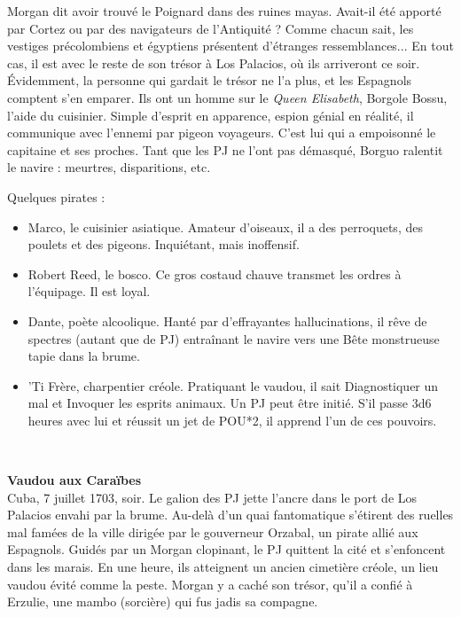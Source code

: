 \documentclass[11pt,twoside,a4paper]{book}
\begin{document}
Morgan dit avoir trouv{\'e} le Poignard dans des ruines mayas. Avait-il {\'e}t{\'e} apport{\'e} par Cortez ou par des navigateurs de l'Antiquit{\'e} ? Comme chacun sait, les vestiges pr{\'e}colombiens et {\'e}gyptiens pr{\'e}sentent d'{\'e}tranges ressemblances... En tout cas, il est avec le reste de son tr{\'e}sor {\`a} Los Palacios, o{\`u} ils arriveront ce soir. {\'E}videmment, la personne qui gardait le tr{\'e}sor ne l'a plus, et les Espagnols comptent s'en emparer. Ils ont un homme sur le \emph{Queen Elisabeth}, Borgole Bossu, l'aide du cuisinier. Simple d'esprit en apparence, espion g{\'e}nial en r{\'e}alit{\'e}, il communique avec l'ennemi par pigeon voyageurs. C'est lui qui a empoisonn{\'e} le capitaine et ses proches. Tant que les PJ ne l'ont pas d{\'e}masqu{\'e}, Borguo ralentit le navire : meurtres, disparitions, etc.~\\

\clearpage

Quelques pirates :
\setlength\parindent{20pt}
\begin{itemize}
	\item Marco, le cuisinier asiatique. Amateur d'oiseaux, il a des perroquets, des poulets et des pigeons. Inqui{\'e}tant, mais inoffensif.
	\item Robert Reed, le bosco. Ce gros costaud chauve transmet les ordres {\`a} l'{\'e}quipage. Il est loyal.
	\item Dante, po{\`e}te alcoolique. Hant{\'e} par d'effrayantes hallucinations, il r{\^e}ve de spectres (autant que de PJ) entra{\^i}nant le navire vers une B{\^e}te monstrueuse tapie dans la brume.
	\item 'Ti Fr{\`e}re, charpentier cr{\'e}ole. Pratiquant le vaudou, il sait Diagnostiquer un mal et Invoquer les esprits animaux. Un PJ peut {\^e}tre initi{\'e}. S'il passe 3d6 heures avec lui et r{\'e}ussit un jet de POU*2, il apprend l'un de ces pouvoirs.
\end{itemize}~\\
\setlength\parindent{0pt}

\textbf{\large Vaudou aux Cara{\"i}bes}~\\

Cuba, 7 juillet 1703, soir. Le galion des PJ jette l'ancre dans le port de Los Palacios envahi par la brume. Au-del{\`a} d'un quai fantomatique s'{\'e}tirent des ruelles mal fam{\'e}es de la ville dirig{\'e}e par le gouverneur Orzabal, un pirate alli{\'e} aux Espagnols. Guid{\'e}s par un Morgan clopinant, le PJ quittent la cit{\'e} et s'enfoncent dans les marais. En une heure, ils atteignent un ancien cimeti{\`e}re cr{\'e}ole, un lieu vaudou {\'e}vit{\'e} comme la peste. Morgan y a cach{\'e} son tr{\'e}sor, qu'il a confi{\'e} {\`a} Erzulie, une mambo (sorci{\`e}re) qui fus jadis sa compagne.~\\
\end{document}
